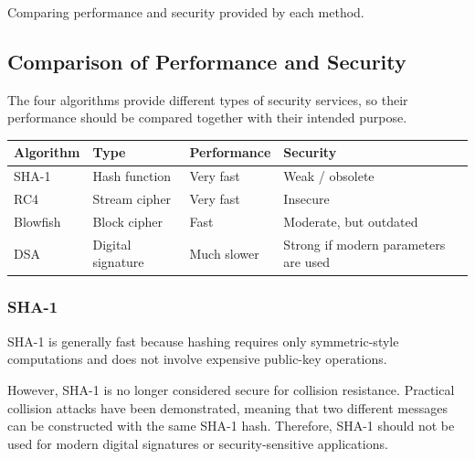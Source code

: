 \documentclass[a4paper, 10pt]{article}
\begin{document}
\begin{problem}
\begin{subproblems_alpha}
	\item Comparing performance and security provided by each method.
	      \myspace[v][3][mm]
	      \begin{solution}
		      \subsection*{Comparison of Performance and Security}

		      The four algorithms provide different types of security services, so their performance should be compared together with their intended purpose.

		      \begin{center}
			      \begin{tabular}{|l|l|l|l|}
				      \hline
				      \textbf{Algorithm} & \textbf{Type} & \textbf{Performance} & \textbf{Security} \\
				      \hline
				      SHA-1              &
				      Hash function      &
				      Very fast          &
				      Weak / obsolete                                                               \\
				      \hline
				      RC4                &
				      Stream cipher      &
				      Very fast          &
				      Insecure                                                                      \\
				      \hline
				      Blowfish           &
				      Block cipher       &
				      Fast               &
				      Moderate, but outdated                                                        \\
				      \hline
				      DSA                &
				      Digital signature  &
				      Much slower        &
				      Strong if modern parameters are used                                          \\
				      \hline
			      \end{tabular}
		      \end{center}

		      \subsubsection*{SHA-1}

		      SHA-1 is generally fast because hashing requires only symmetric-style computations and does not involve expensive public-key operations.

		      However, SHA-1 is no longer considered secure for collision resistance. Practical collision attacks have been demonstrated, meaning that two different messages can be constructed with the same SHA-1 hash. Therefore, SHA-1 should not be used for modern digital signatures or security-sensitive applications.


\end{solution}
\end{subproblems_alpha}
\end{problem}
\end{document}
